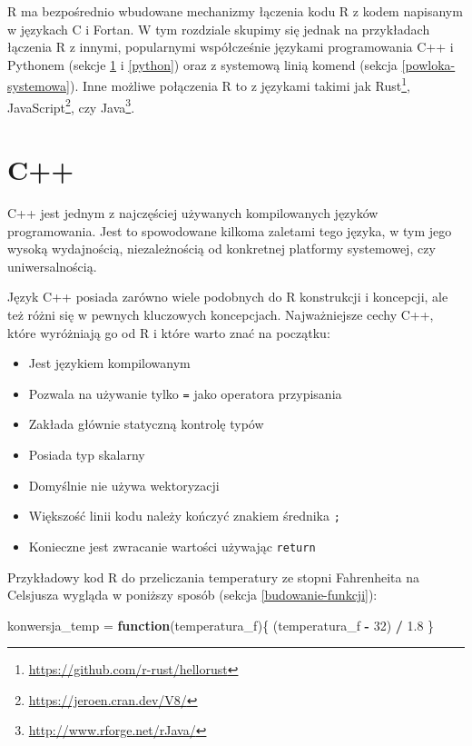 \documentclass[paper=6in:9in,pagesize=pdftex,headinclude=on,footinclude=on,10pt]{scrbook}
\newenvironment{Shaded}{\begin{snugshade}}{\end{snugshade}}
\newcommand{\ControlFlowTok}[1]{\textcolor[rgb]{0.13,0.29,0.53}{\textbf{#1}}}
\newcommand{\DecValTok}[1]{\textcolor[rgb]{0.00,0.00,0.81}{#1}}
\newcommand{\FloatTok}[1]{\textcolor[rgb]{0.00,0.00,0.81}{#1}}
\newcommand{\NormalTok}[1]{#1}
\newcommand{\OperatorTok}[1]{\textcolor[rgb]{0.81,0.36,0.00}{\textbf{#1}}}
\newcommand{\StringTok}[1]{\textcolor[rgb]{0.31,0.60,0.02}{#1}}
\DeclareRobustCommand{\href}[2]{#2\footnote{\url{#1}}}
\providecommand{\tightlist}{%
  \setlength{\itemsep}{0pt}\setlength{\parskip}{0pt}}
\begin{document}
R ma bezpośrednio wbudowane mechanizmy łączenia kodu R z kodem napisanym w językach C i Fortan.
W tym rozdziale skupimy się jednak na przykładach łączenia R z innymi, popularnymi współcześnie językami programowania C++ i Pythonem (sekcje \ref{cpp} i \ref{python}) oraz z systemową linią komend (sekcja \ref{powloka-systemowa}).
Inne możliwe połączenia R to z językami takimi jak \href{https://github.com/r-rust/hellorust}{Rust}, \href{https://jeroen.cran.dev/V8/}{JavaScript}, czy \href{http://www.rforge.net/rJava/}{Java}.

\hypertarget{cpp}{%
\section{C++}\label{cpp}}

C++ jest jednym z najczęściej używanych kompilowanych języków programowania.
Jest to spowodowane kilkoma zaletami tego języka, w tym jego wysoką wydajnością, niezależnością od konkretnej platformy systemowej, czy uniwersalnością.

Język C++ posiada zarówno wiele podobnych do R konstrukcji i koncepcji, ale też różni się w pewnych kluczowych koncepcjach.
Najważniejsze cechy C++, które wyróżniają go od R i które warto znać na początku:

\begin{itemize}
\tightlist
\item
  Jest językiem kompilowanym
\item
  Pozwala na używanie tylko \texttt{=} jako operatora przypisania
\item
  Zakłada głównie statyczną kontrolę typów
\item
  Posiada typ skalarny
\item
  Domyślnie nie używa wektoryzacji
\item
  Większość linii kodu należy kończyć znakiem średnika \texttt{;}
\item
  Konieczne jest zwracanie wartości używając \texttt{return}
\end{itemize}

Przykładowy kod R do przeliczania temperatury ze stopni Fahrenheita na Celsjusza wygląda w poniższy sposób (sekcja \ref{budowanie-funkcji}):

\begin{Shaded}
\begin{Highlighting}[]
\NormalTok{konwersja_temp =}\StringTok{ }\ControlFlowTok{function}\NormalTok{(temperatura_f)\{}
\NormalTok{    (temperatura_f }\OperatorTok{-}\StringTok{ }\DecValTok{32}\NormalTok{) }\OperatorTok{/}\StringTok{ }\FloatTok{1.8}
\NormalTok{\}}
\end{Highlighting}
\end{Shaded}
\end{document}
